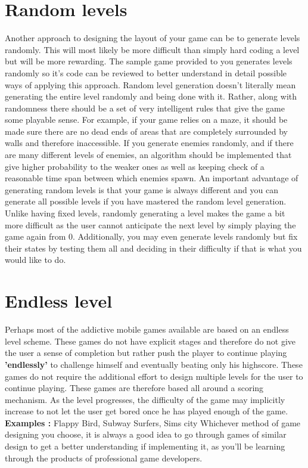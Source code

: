 \documentclass[11pt,fleqn]{book} %
\begin{document}
\section{Random levels}
Another approach to designing the layout of your game can be to generate levels randomly. This will most likely be more difficult than simply hard coding a level but will be more rewarding. The sample game provided to you generates levels randomly so it's code can be reviewed to better understand in detail possible ways of applying this approach. \newline
Random level generation doesn't literally mean generating the entire level randomly and being done with it. Rather, along with randomness there should be a set of very intelligent rules that give the game some playable sense. For example, if your game relies on a maze, it should be made sure there are no dead ends of areas that are completely surrounded by walls and therefore inaccessible. If you generate enemies randomly, and if there are many different levels of enemies, an algorithm should be implemented that give higher probability to the weaker ones as well as keeping check of a reasonable time span between which enemies spawn.
\newline
An important advantage of generating random levels is that your game is always different and you can generate all possible levels if you have mastered the random level generation. Unlike having fixed levels, randomly generating a level makes the game a bit more difficult as the user cannot anticipate the next level by simply playing the game again from 0.
\newline
Additionally, you may even generate levels randomly but fix their states by testing them all and deciding in their difficulty if that is what you would like to do.
\section{Endless level}
Perhaps most of the addictive mobile games available are based on an endless level scheme. These games do not have explicit stages and therefore do not give the user a sense of completion but rather push the player to continue playing \textbf{'endlessly'} to challenge himself and eventually beating only his highscore. These games do not require the additional effort to design multiple levels for the user to continue playing. These games are therefore based all around a scoring mechanism. As the level progresses, the difficulty of the game may implicitly increase to not let the user get bored once he has played enough of the game.
\newline
\newline
\textbf{Examples :} Flappy Bird, Subway Surfers, Sims city
\newline
\newline
\newline
Whichever method of game designing you choose, it is always a good idea to go through games of similar design to get a better understanding if implementing it, as you'll be learning through the products of professional game developers.
\end{document}
